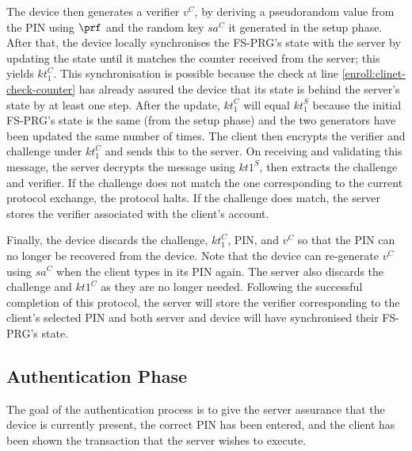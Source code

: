 \documentclass[runningheads]{llncs}
\newcommand{\sss}{\scriptscriptstyle}
\newcommand{\keyt}{\ensuremath{{kt}}}
\newcommand{\salt}{\ensuremath{{sa}}}
\renewcommand{\verifier}{\ensuremath{{v}}}
\newcommand{\VC}[1]{\ensuremath{#1^{\sss C}}}
\newcommand{\VS}[1]{\ensuremath{#1^{\sss S}}}
\begin{document}
The device then generates a verifier $\VC{\verifier}$, by deriving a pseudorandom value from the PIN using $\prf$ and the random key $\VC{\salt}$ it generated in the setup phase.  After that, the device locally synchronises the FS-PRG's state with the server by updating the state until it matches the counter received from the server; this yields \VC{\keyt_{\sss 1}}. This synchronisation is possible because the check at line \ref{enroll:clinet-check-counter} has already assured the device that its state is behind the server's state by at least one step. After the update, \VC{\keyt_{\sss 1}} will equal \VS{\keyt_{\sss 1}} because the initial FS-PRG's state is the same (from the setup phase) and the two generators have been updated the same number of times. The client then encrypts the verifier and challenge under \VC{\keyt_{\sss 1}} and sends this to the server.
%
%
On receiving and validating this message, the server decrypts the message using \VS{\keyt{\sss 1}}, then extracts the challenge and verifier.
If the challenge does not match the one corresponding to the current protocol exchange, the protocol halts.
If the challenge does match, the server stores the verifier associated with the client's account.

Finally, the device discards the challenge, \VC{\keyt_{\sss 1}}, PIN, and \VC{\verifier} so that the PIN can no longer be recovered from the device. Note that the device can re-generate \VC{\verifier} using \VC{\salt} when the client types in its PIN again. The server also discards the challenge and \VC{\keyt{\sss 1}} as they are no longer needed. Following the successful completion of this protocol, the server will store the verifier corresponding to the client's selected PIN and both server and device will have synchronised their FS-PRG's state.

\vspace{-3mm}
\subsection{Authentication Phase}
\label{sec:authentication}

The goal of the authentication process is to give the server assurance that the device is currently present, the correct PIN has been entered, and the client has been shown the transaction that the server wishes to execute. 
%
\end{document}
